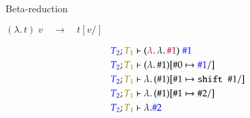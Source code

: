 \documentclass{beamer}
\begin{document}
\begin{frame}{Beta-reduction}

$(\lambda. \, t) \; v \quad \longrightarrow \quad t[v/]$

\begin{align*}
{\color{blue}T_2}; {\color{olive}T_1} &\vdash ({\color{purple}\lambda}. \, \lambda. \, {\color{purple}\#1}) \; {\color{blue}\#1} \\
{\color{blue}T_2}; {\color{olive}T_1} &\vdash {(}\lambda. \, {\#1}{)}[\#0 \mapsto {\color{blue}\#1}/] \\
{\color{blue}T_2}; {\color{olive}T_1} &\vdash \lambda. \, ( {\#1})[\#1 \mapsto {\texttt{shift }\#1}/] \\
{\color{blue}T_2}; {\color{olive}T_1} &\vdash \lambda. \, ( {\#1})[\#1 \mapsto {\#2}/] \\
{\color{blue}T_2}; {\color{olive}T_1} &\vdash \lambda. {\color{blue}\#2}
\end{align*}
\end{frame}
\end{document}
